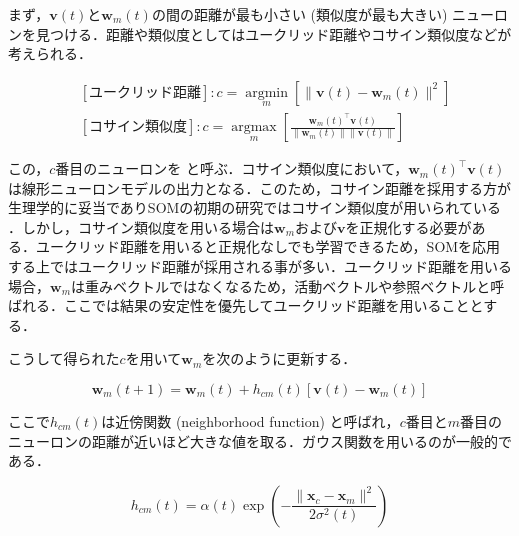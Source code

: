 まず，$\mathbf{v}(t)$と$\mathbf{w}_m(t)$の間の距離が最も小さい (類似度が最も大きい) ニューロンを見つける．距離や類似度としてはユークリッド距離やコサイン類似度などが考えられる．


\begin{align}
&[\text{ユークリッド距離}]: c = \underset{m}{\operatorname{argmin}}\left[\|\mathbf{v}(t)-\mathbf{w}_m(t)\|^2\right]\\
&[\text{コサイン類似度}]: c  = \underset{m}{\operatorname{argmax}}\left[\frac{\mathbf{w}_m(t)^\top\mathbf{v}(t)}{\|\mathbf{w}_m(t)\|\|\mathbf{v}(t)\|}\right]
\end{align}


この，$c$番目のニューロンを\textbf{} と呼ぶ．コサイン類似度において，$\mathbf{w}_m(t)^\top\mathbf{v}(t)$は線形ニューロンモデルの出力となる．このため，コサイン距離を採用する方が生理学的に妥当でありSOMの初期の研究ではコサイン類似度が用いられている \cite{Kohonen1982-mn}．しかし，コサイン類似度を用いる場合は$\mathbf{w}_m$および$\mathbf{v}$を正規化する必要がある．ユークリッド距離を用いると正規化なしでも学習できるため，SOMを応用する上ではユークリッド距離が採用される事が多い．ユークリッド距離を用いる場合，$\mathbf{w}_m$は重みベクトルではなくなるため，活動ベクトルや参照ベクトルと呼ばれる．ここでは結果の安定性を優先してユークリッド距離を用いることとする．

こうして得られた$c$を用いて$\mathbf{w}_m$を次のように更新する．


\begin{equation}
\mathbf{w}_m(t+1)=\mathbf{w}_m(t)+h_{cm}(t)[\mathbf{v}(t)-\mathbf{w}_m(t)]
\end{equation}


ここで$h_{cm}(t)$は近傍関数 (neighborhood function) と呼ばれ，$c$番目と$m$番目のニューロンの距離が近いほど大きな値を取る．ガウス関数を用いるのが一般的である．


\begin{equation}
h_{cm}(t)=\alpha(t)\exp\left(-\frac{\|\mathbf{x}_c-\mathbf{x}_m\|^2}{2\sigma^2(t)}\right)
\end{equation}


